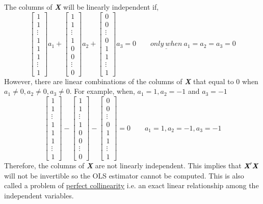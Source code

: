 \documentclass[12pt]{report}
\begin{document}
\noindent The columns of \textit{\textbf{X}} will be linearly independent if,
$$
\begin{bmatrix}
1 \\
1 \\
\vdots \\
1 \\
1 \\
1 \\
\vdots \\
1
\end{bmatrix}
a_1
+
\begin{bmatrix}
1 \\
1 \\
\vdots \\
1 \\
0 \\
0 \\
\vdots \\
0
\end{bmatrix}
a_2
+
\begin{bmatrix}
0 \\
0 \\
\vdots \\
0 \\
1 \\
1 \\
\vdots \\
1
\end{bmatrix}
a_3
=
0
\qquad
\underline{only\ when}\ a_1 = a_2 = a_3 = 0
$$
\noindent However, there are linear combinations of the columns of \textit{\textbf{X}} that equal to 0 when $a_1 \ne 0, a_2 \ne 0, a_3 \ne 0$. For example, when, $a_1=1,a_2=-1$ and $a_3=-1$
$$
\begin{bmatrix}
1 \\
1 \\
\vdots \\
1 \\
1 \\
1 \\
\vdots \\
1
\end{bmatrix}
-
\begin{bmatrix}
1 \\
1 \\
\vdots \\
1 \\
0 \\
0 \\
\vdots \\
0
\end{bmatrix}
-
\begin{bmatrix}
0 \\
0 \\
\vdots \\
0 \\
1 \\
1 \\
\vdots \\
1
\end{bmatrix}
=
0
\qquad
a_1 = 1, a_2 = -1, a_3 = -1
$$
\noindent Therefore, the columns of \textit{\textbf{X}} are not linearly independent. This implies that $\textit{\textbf{X}}'\textit{\textbf{X}}$ will not be invertible so the OLS estimator cannot be computed. This is also called a problem of \underline{perfect collinearity} i.e. an exact linear relationship among the independent variables.
\end{document}
